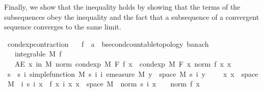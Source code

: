 \begin{isabellebody}
\begin{isamarkuptext}
      Finally, we show that the inequality holds by showing that the terms of the subsequences obey the inequality and the fact that a subsequence of a convergent sequence converges to the same limit.%
\end{isamarkuptext}\isamarkuptrue%
\isamarkupfalse%
\ cond{\isacharunderscore}{\kern0pt}exp{\isacharunderscore}{\kern0pt}contraction{\isacharcolon}{\kern0pt}\isanewline
\ \ \ f\ {\isacharcolon}{\kern0pt}{\isacharcolon}{\kern0pt}\ {\isachardoublequoteopen}{\isacharprime}{\kern0pt}a\ {\isasymRightarrow}\ {\isacharprime}{\kern0pt}b{\isacharcolon}{\kern0pt}{\isacharcolon}{\kern0pt}{\isacharbraceleft}{\kern0pt}second{\isacharunderscore}{\kern0pt}countable{\isacharunderscore}{\kern0pt}topology{\isacharcomma}{\kern0pt}\ banach{\isacharbraceright}{\kern0pt}{\isachardoublequoteclose}\isanewline
\ \ \ {\isachardoublequoteopen}integrable\ M\ f{\isachardoublequoteclose}\isanewline
\ \ \ {\isachardoublequoteopen}AE\ x\ in\ M{\isachardot}{\kern0pt}\ norm\ {\isacharparenleft}{\kern0pt}cond{\isacharunderscore}{\kern0pt}exp\ M\ F\ f\ x{\isacharparenright}{\kern0pt}\ {\isasymle}\ cond{\isacharunderscore}{\kern0pt}exp\ M\ F\ {\isacharparenleft}{\kern0pt}{\isasymlambda}x{\isachardot}{\kern0pt}\ norm\ {\isacharparenleft}{\kern0pt}f\ x{\isacharparenright}{\kern0pt}{\isacharparenright}{\kern0pt}\ x{\isachardoublequoteclose}\ \isanewline
%
\isadelimproof
%
\endisadelimproof
%
\isatagproof
{}\isamarkupfalse%
\ {\isacharminus}{\kern0pt}\isanewline
\ \ \isamarkupfalse%
\ s\ \ s{\isacharcolon}{\kern0pt}\ {\isachardoublequoteopen}{\isasymAnd}i{\isachardot}{\kern0pt}\ simple{\isacharunderscore}{\kern0pt}function\ M\ {\isacharparenleft}{\kern0pt}s\ i{\isacharparenright}{\kern0pt}{\isachardoublequoteclose}\ {\isachardoublequoteopen}{\isasymAnd}i{\isachardot}{\kern0pt}\ emeasure\ M\ {\isacharbraceleft}{\kern0pt}y\ {\isasymin}\ space\ M{\isachardot}{\kern0pt}\ s\ i\ y\ {\isasymnoteq}\ {}{\isacharbraceright}{\kern0pt}\ {\isasymnoteq}\ {\isasyminfinity}{\isachardoublequoteclose}\ {\isachardoublequoteopen}{\isasymAnd}x{\isachardot}{\kern0pt}\ x\ {\isasymin}\ space\ M\ {\isasymLongrightarrow}\ {\isacharparenleft}{\kern0pt}{\isasymlambda}i{\isachardot}{\kern0pt}\ s\ i\ x{\isacharparenright}{\kern0pt}\ {\isasymlonglonglongrightarrow}\ f\ x{\isachardoublequoteclose}\ {\isachardoublequoteopen}{\isasymAnd}i\ x{\isachardot}{\kern0pt}\ x\ {\isasymin}\ space\ M\ {\isasymLongrightarrow}\ norm\ {\isacharparenleft}{\kern0pt}s\ i\ x{\isacharparenright}{\kern0pt}\ {\isasymle}\ {}\ {\isacharasterisk}{\kern0pt}\ norm\ {\isacharparenleft}{\kern0pt}f\ x{\isacharparenright}{\kern0pt}{\isachardoublequoteclose}\ \isanewline

\end{isabellebody}
